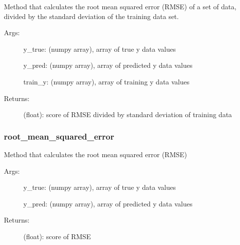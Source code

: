 \documentclass[letterpaper,10pt,english]{sphinxmanual}
\begin{document}
\begin{fulllineitems}
\label{\detokenize{api/mastml.metrics.rmse_over_stdev:mastml.metrics.rmse_over_stdev}}
Method that calculates the root mean squared error (RMSE) of a set of data, divided by the standard deviation of
the training data set.
\begin{description}
\item[{Args:}] \leavevmode
y\_true: (numpy array), array of true y data values

y\_pred: (numpy array), array of predicted y data values

train\_y: (numpy array), array of training y data values

\item[{Returns:}] \leavevmode
(float): score of RMSE divided by standard deviation of training data

\end{description}

\end{fulllineitems}



\subsubsection{root\_mean\_squared\_error}
\label{\detokenize{api/mastml.metrics.root_mean_squared_error:root-mean-squared-error}}\label{\detokenize{api/mastml.metrics.root_mean_squared_error::doc}}

\begin{fulllineitems}
\label{\detokenize{api/mastml.metrics.root_mean_squared_error:mastml.metrics.root_mean_squared_error}}
Method that calculates the root mean squared error (RMSE)
\begin{description}
\item[{Args:}] \leavevmode
y\_true: (numpy array), array of true y data values

y\_pred: (numpy array), array of predicted y data values

\item[{Returns:}] \leavevmode
(float): score of RMSE

\end{description}

\end{fulllineitems}
\end{document}
